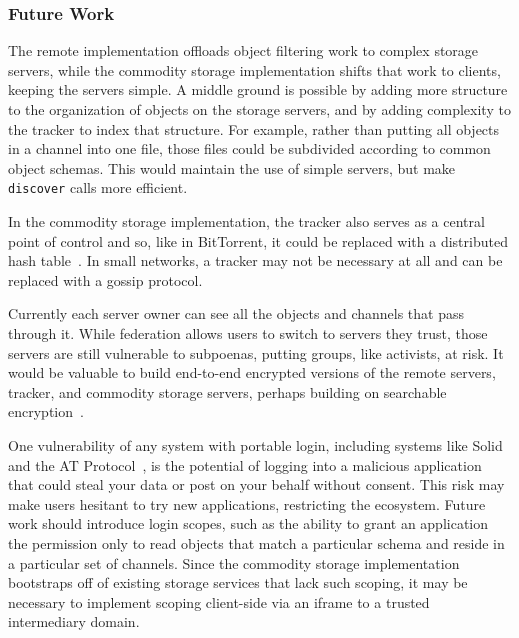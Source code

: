\subsubsection{Future Work}
\label{above-and-below:below:future-work}

The remote implementation offloads object filtering work to complex storage servers,
while the commodity storage implementation shifts that work to clients, keeping the servers simple.
A middle ground is possible by adding more structure to the organization of objects on
the storage servers, and by adding complexity to the tracker to index that structure.
For example, rather than putting all objects in a channel into one file,
those files could be subdivided according to common object schemas.
This would maintain the use of simple servers, but make \texttt{discover} calls more efficient.

In the commodity storage implementation, the tracker also serves as a central point of control and so, like in BitTorrent,
it could be replaced with a distributed hash table~\cite{bittorrentdht}. In small networks,
a tracker may not be necessary at all and can be replaced with a gossip protocol.

Currently each server owner can see all the objects and channels
that pass through it. While federation allows users to switch
to servers they trust, those servers are still vulnerable to
subpoenas, putting groups, like activists, at risk.
It would be valuable to build end-to-end encrypted versions of the remote servers,
tracker, and commodity storage servers, perhaps building on
searchable encryption~\cite{searchableencryption}.

One vulnerability of any system with portable login,
including systems like Solid and the AT Protocol~{\cite{bluesky}},
is the potential of logging into
a malicious application that could steal your data or
post on your behalf without consent.
This risk may make users hesitant to try new applications,
restricting the ecosystem.
Future work should introduce login scopes, such as
the ability to grant an application the permission only to read objects
that match a particular schema and reside in a particular set of channels.
Since the commodity storage implementation bootstraps off of
existing storage services that lack such scoping,
it may be necessary to implement scoping client-side
via an iframe to a trusted intermediary domain.
